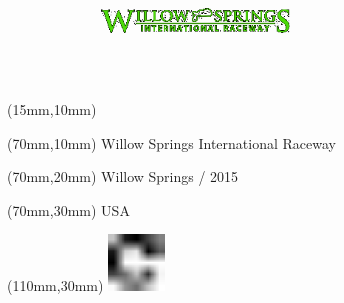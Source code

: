 \null\newpage
\begin{textblock*}{50mm}(15mm,10mm)%
\includegraphics[width=50mm]{LG/WIS.png}
\end{textblock*}
\begin{textblock*}{130mm}(70mm,10mm)%
{\fontsize{20}{20}\selectfont Willow Springs International Raceway}\\
\end{textblock*}
\begin{textblock*}{120mm}(70mm,20mm)%
{\fontsize{16}{16}\selectfont Willow Springs / 2015}\\
\end{textblock*}
\begin{textblock*}{120mm}(70mm,30mm)%
{\fontsize{12}{12}\selectfont USA}
\end{textblock*}
\begin{textblock*}{30mm}(110mm,30mm)%
\centering
\includegraphics[height=15mm]{icons/fa-rotate-right.pdf}
\end{textblock*}
